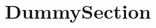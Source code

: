 \documentclass[../Master.tex]{subfiles}
\begin{document}
\section{DummySection}
\label{sec:dummy}
\end{document}
